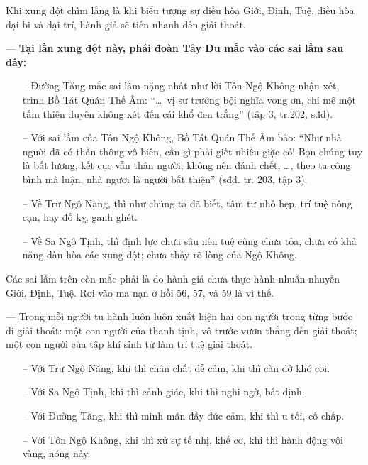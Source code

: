 Khi xung đột chìm lắng là khi biểu tượng sự điều hòa Giới, Định, Tuệ, điều hòa đại bi và đại trí, hành giả sẽ tiến nhanh đến giải thoát.

— {\bf Tại lần xung đột này, phái đoàn Tây Du mắc vào các sai lầm sau đây:}

\begin{itemize}
    \item[–] Đường Tăng mắc sai lầm nặng nhất như lời Tôn Ngộ Không nhận xét, trình Bồ Tát Quán Thế Âm: ``\ldots ~vị sư trưởng bội nghĩa vong ơn, chỉ mê một tấm thiện duyên không xét đến cái khổ đen trắng'' (tập 3, tr.202, sđd).

    \item[–] Với sai lầm của Tôn Ngộ Không, Bồ Tát Quán Thế Âm bảo: ``Như nhà người đã có thần thông vô biên, cần gì phải giết nhiều giặc cỏ! Bọn chúng tuy là bất lương, kết cục vẫn thân người, không nên đánh chết, \ldots, theo ta công bình mà luận, nhà ngươi là người bất thiện'' (sđd. tr. 203, tập 3).

    \item[–] Về Trư Ngộ Năng, thì như chúng ta đã biết, tâm tư nhỏ hẹp, trí tuệ nông cạn, hay đố kỵ, ganh ghét.

    \item[–] Về Sa Ngộ Tịnh, thì định lực chưa sâu nên tuệ cũng chưa tỏa, chưa có khả năng dàn hòa các xung đột; chưa thấy rõ lòng của Ngộ Không.
\end{itemize}

Các sai lầm trên còn mắc phải là do hành giả chưa thực hành nhuần nhuyễn Giới, Định, Tuệ. Rơi vào ma nạn ở hồi 56, 57, và 59 là vì thế.

— Trong mỗi người tu hành luôn luôn xuất hiện hai con người trong từng bước đi giải thoát: một con người của thanh tịnh, vô trước vươn thẳng đến giải thoát; một con người của tập khí sinh tử làm trí tuệ giải thoát.

\begin{itemize}
    \item[–] Với Trư Ngộ Năng, khi thì chân chất dễ cảm, khi thì càn dở khó coi.

    \item[–]  Với Sa Ngộ Tịnh, khi thì cảnh giác, khi thì nghi ngờ, bất định.

    \item[–] Với Đường Tăng, khi thì minh mẫn đầy đức cảm, khi thì u tối, cố chấp.

    \item[–] Với Tôn Ngộ Không, khi thì xử sự tế nhị, khế cơ, khi thì hành động vội vàng, nóng nảy.
\end{itemize}

